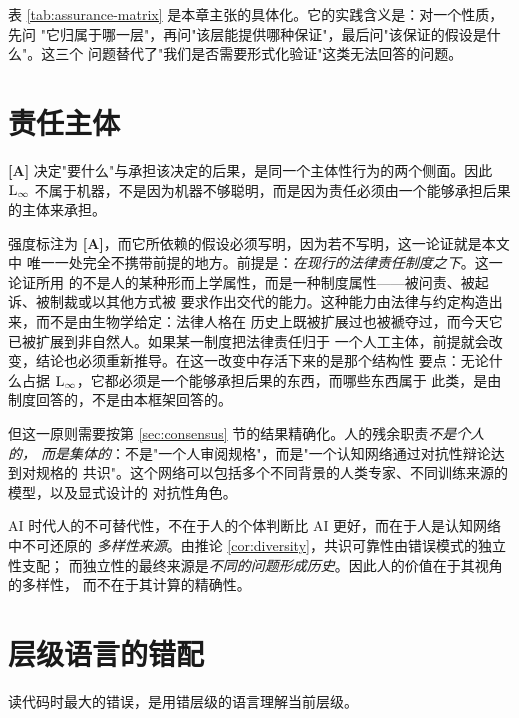 表 \ref{tab:assurance-matrix} 是本章主张的具体化。它的实践含义是：对一个性质，先问
"它归属于哪一层"，再问"该层能提供哪种保证"，最后问"该保证的假设是什么"。这三个
问题替代了"我们是否需要形式化验证"这类无法回答的问题。

\section{责任主体}\label{sec:linf}

\begin{principle}[责任不可转移]\label{pr:responsibility}\textbf{[A]}
决定"要什么"与承担该决定的后果，是同一个主体性行为的两个侧面。因此 $\mathrm{L}_{\infty}$
不属于机器，不是因为机器不够聪明，而是因为责任必须由一个能够承担后果的主体来承担。
\end{principle}

强度标注为 \textbf{[A]}，而它所依赖的假设必须写明，因为若不写明，这一论证就是本文中
唯一一处完全不携带前提的地方。前提是：\emph{在现行的法律责任制度之下}。这一论证所用
的不是人的某种形而上学属性，而是一种制度属性——被问责、被起诉、被制裁或以其他方式被
要求作出交代的能力。这种能力由法律与约定构造出来，而不是由生物学给定：法律人格在
历史上既被扩展过也被褫夺过，而今天它已被扩展到非自然人。如果某一制度把法律责任归于
一个人工主体，前提就会改变，结论也必须重新推导。在这一改变中存活下来的是那个结构性
要点：无论什么占据 $\mathrm{L}_{\infty}$，它都必须是一个能够承担后果的东西，而哪些东西属于
此类，是由制度回答的，不是由本框架回答的。

但这一原则需要按第 \ref{sec:consensus} 节的结果精确化。人的残余职责\emph{不是个人的，
而是集体的}：不是"一个人审阅规格"，而是"一个认知网络通过对抗性辩论达到对规格的
共识"。这个网络可以包括多个不同背景的人类专家、不同训练来源的模型，以及显式设计的
对抗性角色。

\begin{principle}[多样性不可替代]\label{pr:human-diversity}
AI 时代人的不可替代性，不在于人的个体判断比 AI 更好，而在于人是认知网络中不可还原的
\emph{多样性来源}。由推论 \ref{cor:diversity}，共识可靠性由错误模式的独立性支配；
而独立性的最终来源是\emph{不同的问题形成历史}。因此人的价值在于其视角的多样性，
而不在于其计算的精确性。
\end{principle}

\section{层级语言的错配}\label{sec:antipattern}

\begin{principle}[层级语言一致性]\label{pr:level-language}
读代码时最大的错误，是用错层级的语言理解当前层级。
\end{principle}

